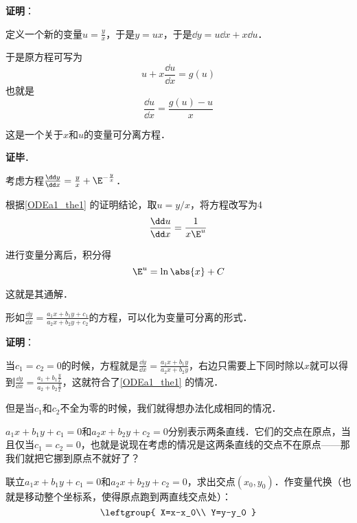 \textbf{证明}：

定义一个新的变量$u=\frac{y}{x}$，于是$y=ux$，于是$\dd y=u\dd x+x\dd u$．

于是原方程可写为
\begin{equation}
u+x\frac{\dd u}{\dd x}=g(u)
\end{equation}
也就是
\begin{equation}
\frac{\dd u}{\dd x}=\frac{g(u)-u}{x}
\end{equation}

这是一个关于$x$和$u$的变量可分离方程．

\textbf{证毕}．

\begin{example}{}
考虑方程$\frac{\dd y}{\dd x}=\frac{y}{x}+\E^{-\frac{y}{x}}$．

根据\autoref{ODEa1_the1} 的证明结论，取$u=y/x$，将方程改写为4
\begin{equation}
\frac{\dd u}{\dd x}=\frac{1}{x\E^u}
\end{equation}

进行变量分离后，积分得
\begin{equation}
\E^u=\ln\abs{x}+C
\end{equation}

这就是其通解．


\end{example}


\begin{corollary}{}\label{ODEa1_cor1}
形如$\frac{\dd y}{\dd x}=\frac{a_1x+b_1y+c_1}{a_2x+b_2y+c_2}$的方程，可以化为变量可分离的形式．
\end{corollary}

\textbf{证明}：

当$c_1=c_2=0$的时候，方程就是$\frac{\dd y}{\dd x}=\frac{a_1x+b_1y}{a_2x+b_2y}$，右边只需要上下同时除以$x$就可以得到$\frac{\dd y}{\dd x}=\frac{a_1+b_1\frac{y}{x}}{a_2+b_2\frac{y}{x}}$，这就符合了\autoref{ODEa1_the1} 的情况．

但是当$c_1$和$c_2$不全为零的时候，我们就得想办法化成相同的情况．

$a_1x+b_1y+c_1=0$和$a_2x+b_2y+c_2=0$分别表示两条直线．它们的交点在原点，当且仅当$c_1=c_2=0$，也就是说现在考虑的情况是这两条直线的交点不在原点——那我们就把它挪到原点不就好了？

联立$a_1x+b_1y+c_1=0$和$a_2x+b_2y+c_2=0$，求出交点$(x_0, y_0)$．作变量代换（也就是移动整个坐标系，使得原点跑到两直线交点处）：
\begin{equation}
\leftgroup{
    X=x-x_0\\
    Y=y-y_0
}
\end{equation}

